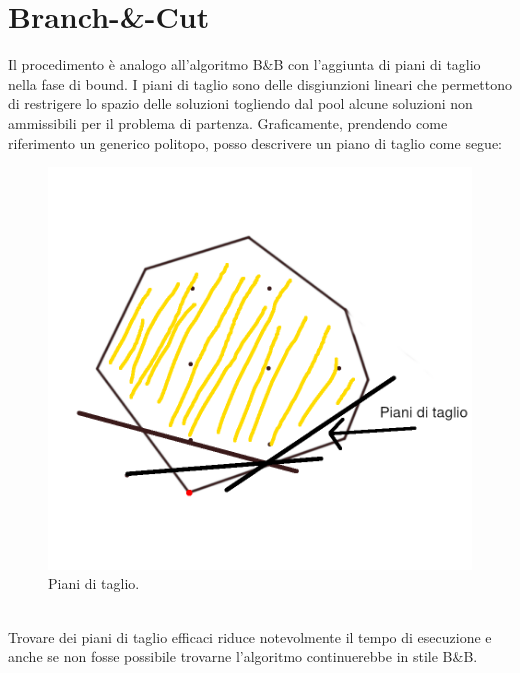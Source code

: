\documentclass[12pt,a4paper,twoside,openright]{book}
\begin{document}
\section{Branch-\&-Cut}
Il procedimento è analogo all'algoritmo B\&B con l’aggiunta di piani di taglio nella fase di bound. I
piani di taglio sono delle disgiunzioni lineari che permettono di restrigere lo spazio delle soluzioni
togliendo dal pool alcune soluzioni non ammissibili per il problema di partenza. Graficamente,
 prendendo come riferimento un generico politopo, posso descrivere un piano di taglio come segue:\\
\begin{figure}[ht]
    \centering
    \includegraphics [scale = 0.7]{cutting_planes.png}
    \caption{Piani di taglio. }
    \label{fig:cuts}
\end{figure}\\
Trovare dei piani di taglio efficaci riduce notevolmente il tempo di esecuzione e anche se non fosse 
possibile trovarne l'algoritmo continuerebbe in stile B\&B.
\end{document}

